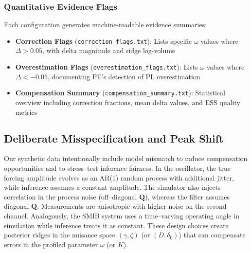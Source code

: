 \documentclass[conference]{IEEEtran}
\begin{document}
\subsubsection{Quantitative Evidence Flags}
Each configuration generates machine-readable evidence summaries:
\begin{itemize}
\item \textbf{Correction Flags} (\texttt{correction\_flags.txt}): Lists specific $\omega$ values where $\Delta > 0.05$, with delta magnitude and ridge log-volume
\item \textbf{Overestimation Flags} (\texttt{overestimation\_flags.txt}): Lists $\omega$ values where $\Delta < -0.05$, documenting PE's detection of PL overestimation
\item \textbf{Compensation Summary} (\texttt{compensation\_summary.txt}): Statistical overview including correction fractions, mean delta values, and ESS quality metrics
\end{itemize}

\subsection{Deliberate Misspecification and Peak Shift}
\label{subsec:misspec}

Our synthetic data intentionally include model mismatch to induce compensation opportunities and to stress--test inference fairness. In the oscillator, the true forcing amplitude evolves as an AR(1) random process with additional jitter, while inference assumes a constant amplitude. The simulator also injects correlation in the process noise (off--diagonal $\mathbf{Q}$), whereas the filter assumes diagonal $\mathbf{Q}$. Measurements are anisotropic with higher noise on the second channel. Analogously, the SMIB system uses a time--varying operating angle in simulation while inference treats it as constant. These design choices create posterior ridges in the nuisance space $(\gamma,\zeta)$ (or $(D,\delta_0)$) that can compensate errors in the profiled parameter $\omega$ (or $K$).
\end{document}
